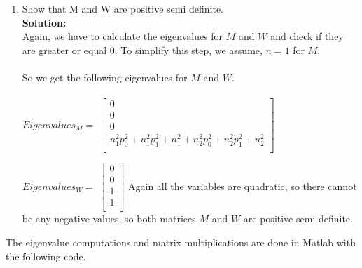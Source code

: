 \documentclass{article}
\numberwithin{equation}{section}
\newcommand{\0}{\mathbf{0}}
\begin{document}
\begin{enumerate}
\begin{enumerate}
		\item Show that M and W are positive semi definite. \\
 		\textbf{Solution:}
		\\
		Again, we have to calculate the eigenvalues for $M$ and $W$ and check if they are greater or equal $0$. To simplify this step, we assume, $n=1$ for $M$.
		\\
		\\
		So we get the following eigenvalues for $M$ and $W$. \\ \\
		$Eigenvalues_{M}=$
		$\begin{bmatrix} 
		0 \\
		0 \\
		0\\
		n_1^2 p_0^2 + n_1^2 p_1^2 + n_1^2 + n_2^2 p_0^2+ n_2^2 p_1^2 + n_2^2 \\
		\end{bmatrix}$
		\newline \newline
		
		$Eigenvalues_{W}=$
		$\begin{bmatrix} 
		0 \\
		0 \\
		1\\
		1\\
		\end{bmatrix}$
		\newline \newline
		Again all the variables are quadratic, so there cannot be any negative values, so both matrices $M$ and $W$ are positive semi-definite.	
 		\end{enumerate}
	 	
	 \end{enumerate}
 	The eigenvalue computations and matrix multiplications are done in Matlab with the following code.
 	
 	
 	
 
		
\end{document}
